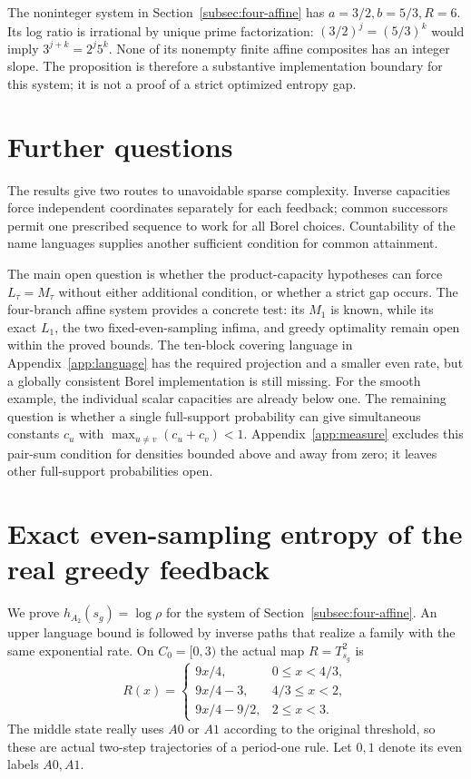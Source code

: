 \documentclass[11pt,reqno]{amsart}
\numberwithin{equation}{section}
\theoremstyle{definition}
\begin{document}
The noninteger system in Section~\ref{subsec:four-affine} has
$a=3/2,b=5/3,R=6$. Its log ratio is irrational by unique prime
factorization: $(3/2)^j=(5/3)^k$ would imply
$3^{j+k}=2^j5^k$. None of its nonempty finite affine composites
has an integer slope. The proposition is therefore a substantive
implementation boundary for this system; it is not a proof of a
strict optimized entropy gap.

\section{Further questions}\label{app:scope}
The results give two routes to unavoidable sparse complexity.
Inverse capacities force independent coordinates separately for each
feedback; common successors permit one prescribed sequence to work
for all Borel choices. Countability of the name languages supplies
another sufficient condition for common attainment.

The main open question is whether the product-capacity hypotheses
can force $L_\tau=M_\tau$ without either additional condition, or
whether a strict gap occurs. The four-branch affine system provides
a concrete test: its $M_1$ is known, while its exact $L_1$, the two
fixed-even-sampling infima, and greedy optimality remain open within
the proved bounds. The ten-block covering language in
Appendix~\ref{app:language} has the required projection and a smaller
even rate, but a globally consistent Borel implementation is still
missing. For the smooth example, the individual scalar capacities
are already below one. The remaining question is whether a single
full-support probability can give simultaneous constants $c_u$ with
$\max_{u\ne v}(c_u+c_v)<1$. Appendix~\ref{app:measure} excludes this
pair-sum condition for densities bounded above and away from zero;
it leaves other full-support probabilities open.


\appendix

\section{Exact even-sampling entropy of the real greedy feedback}
\label{app:greedy}

We prove $h_{A_2}(s_g)=\log\rho$ for the system of
Section~\ref{subsec:four-affine}. An upper language bound is followed by
inverse paths that realize a family with the same exponential rate.
On $C_0=[0,3)$ the actual map $R=T_{s_g}^2$ is
\begin{equation}\label{eq:greedy-R}
 R(x)=\begin{cases}
 9x/4,&0\le x<4/3,\\
 9x/4-3,&4/3\le x<2,\\
 9x/4-9/2,&2\le x<3.
 \end{cases}
\end{equation}
The middle state really uses $A0$ or $A1$ according to the original
threshold, so these are actual two-step trajectories of a period-one
rule. Let $0,1$ denote its even labels $A0,A1$.
\end{document}
